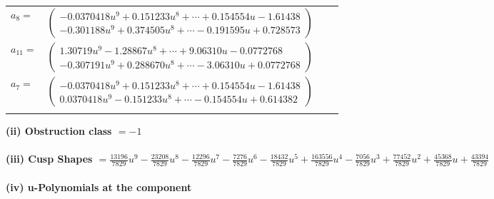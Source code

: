 \documentclass[1p]{elsarticle_modified}
\theoremstyle{definition}
\begin{document}
\begin{tabular}{m{7pt} m{180pt} m{7pt} m{180pt} }
\flushright $a_{8}=$&$\begin{pmatrix}-0.0370418 u^{9}+0.151233 u^{8}+\cdots+0.154554 u-1.61438\\-0.301188 u^{9}+0.374505 u^{8}+\cdots-0.191595 u+0.728573\end{pmatrix}$ \\
\flushright $a_{11}=$&$\begin{pmatrix}1.30719 u^{9}-1.28867 u^{8}+\cdots+9.06310 u-0.0772768\\-0.307191 u^{9}+0.288670 u^{8}+\cdots-3.06310 u+0.0772768\end{pmatrix}$ \\
\flushright $a_{7}=$&$\begin{pmatrix}-0.0370418 u^{9}+0.151233 u^{8}+\cdots+0.154554 u-1.61438\\0.0370418 u^{9}-0.151233 u^{8}+\cdots-0.154554 u+0.614382\end{pmatrix}$\\&\end{tabular}
\flushleft \textbf{(ii) Obstruction class $= -1$}\\~\\
\flushleft \textbf{(iii) Cusp Shapes $= \frac{13196}{7829} u^9-\frac{23208}{7829} u^8-\frac{12296}{7829} u^7-\frac{7276}{7829} u^6-\frac{18432}{7829} u^5+\frac{163556}{7829} u^4-\frac{7056}{7829} u^3+\frac{77452}{7829} u^2+\frac{45368}{7829} u+\frac{43394}{7829}$}\\~\\
\newpage\renewcommand{\arraystretch}{1}
\flushleft \textbf{(iv) u-Polynomials at the component}\newline \\
\end{document}
